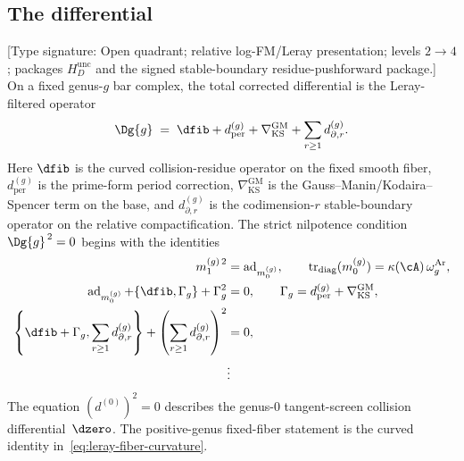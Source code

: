 \subsection{The differential}

\begin{theorem}
\label{thm:genus-differential}
\textup{[Type signature: Open quadrant; relative log-FM/Leray
presentation; levels $2\to4$; packages $H_D^{\mathrm{unc}}$ and the
signed stable-boundary residue-pushforward package.]}
On a fixed genus-$g$ bar complex, the total corrected differential
is the Leray-filtered operator
\begin{equation}\label{eq:leray-corrected-differential}
\Dg{g}
\;=\;
\dfib+d_{\mathrm{per}}^{(g)}
+\nabla_{\mathrm{KS}}^{\mathrm{GM}}
+\sum_{r\geq 1}d_{\partial,r}^{(g)} .
\end{equation}
Here $\dfib$ is the curved collision-residue operator on the
fixed smooth fiber, $d_{\mathrm{per}}^{(g)}$ is the prime-form
period correction, $\nabla_{\mathrm{KS}}^{\mathrm{GM}}$ is the
Gauss--Manin/Kodaira--Spencer term on the base, and
$d_{\partial,r}^{(g)}$ is the codimension-$r$ stable-boundary
operator on the relative compactification. The strict nilpotence
condition $\Dg{g}^{\,2}=0$ begins with the identities
\begin{align}
m_1^{(g)\,2}&=\operatorname{ad}_{m_0^{(g)}},
\qquad
\operatorname{tr}_{\mathrm{diag}}(m_0^{(g)})
=\kappa(\cA)\,\omega_g^{\mathrm{Ar}},
\label{eq:leray-fiber-curvature}\\
\operatorname{ad}_{m_0^{(g)}}
+\{\dfib,\Gamma_g\}+\Gamma_g^2&=0,
\qquad
\Gamma_g=d_{\mathrm{per}}^{(g)}
+\nabla_{\mathrm{KS}}^{\mathrm{GM}},
\label{eq:leray-period-cancels}\\
\left\{\dfib+\Gamma_g,
\sum_{r\geq1}d_{\partial,r}^{(g)}\right\}
+\left(\sum_{r\geq1}d_{\partial,r}^{(g)}\right)^2
&=0 ,
\label{eq:leray-boundary-cancels}\\
&\vdots
\end{align}
The equation $(d^{(0)})^2=0$ describes the genus-$0$ tangent-screen
collision differential~$\dzero$.  The positive-genus fixed-fiber
statement is the curved identity in~\eqref{eq:leray-fiber-curvature}.
\end{theorem}

